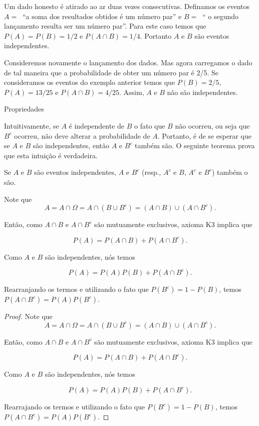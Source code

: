 %
\begin{frame}
\begin{exem}
	Um dado honesto é atirado ao ar duas vezes consecutivas.  Definamos os eventos $A= \ $ ``a soma dos resultados obtidos é um número par'' e $B= \ $ `` o segundo lançamento resulta ser um n\'{u}mero par''. Para este caso temos que $P(A)=P(B)=1/2$ e $P(A\cap B)=1/4$. Portanto $A$ e $B$ são eventos independentes. 
\end{exem}

\begin{exem}
	Consideremos novamente o lançamento dos dados. Mas agora carregamos o dado de tal maneira que a probabilidade de obter um n\'{u}mero par é 2/5. Se consideramos os eventos do exemplo anterior temos que $P(B)=2/5,$   $P(A)=13/25$ e $P(A\cap B)=4/25$.  Assim, $A$ e $B$ não são independentes.
\end{exem}
\end{frame}
%

\begin{frame}{Propriedades}

Intuitivamente, se $A$ é independente de $B$ o fato que $B$ não
ocorreu, ou seja que $B^c$ ocorreu, não deve alterar a probabilidade
de $A$. Portanto, é de se esperar que se $A$ e $B$ são
independentes, então $A$ e $B^c$ também são. O seguinte teorema
prova que esta intuição é verdadeira.

\begin{teo}
Se $A$ e $B$ são eventos independentes, $A$ e $B^c$ (resp., $A^c$ e
$B$, $A^c$ e $B^c$) também o são.
\end{teo}

Note que
$$A=A\cap\Omega=A\cap(B\cup B^c)=(A\cap
B)\cup(A\cap B^c).$$

Então, como $A\cap B$ e $A\cap B^c$ são mutuamente exclusivos,
axioma K3 implica que

$$P(A)=P(A\cap B)+P(A\cap B^c).$$

Como $A$ e $B$ são independentes, nós temos

$$P(A)=P(A)P(B)+P(A\cap B^c).$$

Rearranjando os termos e utilizando o fato que $P(B^c)=1-P(B)$, temos
$P(A\cap B^c)=P(A)P(B^c)$.


\end{frame}


\begin{frame}
\begin{proof}

Note que
$$A=A\cap\Omega=A\cap(B\cup B^c)=(A\cap
B)\cup(A\cap B^c).$$

Então, como $A\cap B$ e $A\cap B^c$ são mutuamente exclusivos,
axioma K3 implica que

$$P(A)=P(A\cap B)+P(A\cap B^c).$$

Como $A$ e $B$ são independentes, nós temos

$$P(A)=P(A)P(B)+P(A\cap B^c).$$

Rearrajando os termos e utilizando o fato que $P(B^c)=1-P(B)$, temos
$P(A\cap B^c)=P(A)P(B^c)$.
\end{proof}


\end{frame}


